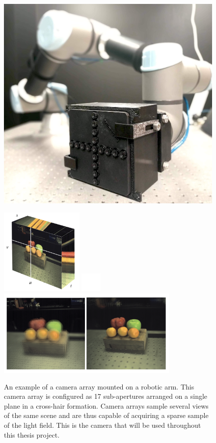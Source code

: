 \documentclass[openany]{book}
\begin{document}
\begin{figure}[tbp]
    \centering
    \includegraphics[width=4.5in]{images/robotcamera.jpg}
    \caption{An example of a camera array mounted on a robotic arm. This camera array is configured as 17 sub-apertures arranged on a single plane in a cross-hair formation. Camera arrays sample several views of the same scene and are thus capable of acquiring a sparse sample of the light field. This is the camera that will be used throughout this thesis project.}
    \label{cameraarray}
    \vspace{1cm}
    \includegraphics[width=1.6in]{images/epipolarimage.png}
    \includegraphics[width=0.4in]{images/blank.png}
    \includegraphics[width=3.5in]{images/fruitfocus.png}

\end{figure}
\end{document}

